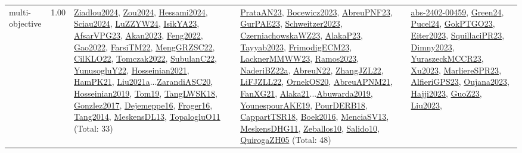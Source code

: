 {\begin{longtable}{p{3cm}r>{\raggedright\arraybackslash}p{6cm}>{\raggedright\arraybackslash}p{6cm}>{\raggedright\arraybackslash}p{8cm}}
\index{multi-objective}\index{Concepts!multi-objective}multi-objective &  1.00 & \hyperref[detail:Ziadlou2024]{Ziadlou2024}, \hyperref[detail:Zou2024]{Zou2024}, \hyperref[detail:Hessami2024]{Hessami2024}, \hyperref[detail:Sciau2024]{Sciau2024}, \hyperref[detail:LuZZYW24]{LuZZYW24}, \hyperref[detail:IsikYA23]{IsikYA23}, \hyperref[detail:AfsarVPG23]{AfsarVPG23}, \hyperref[detail:Akan2023]{Akan2023}, \hyperref[detail:Feng2022]{Feng2022}, \hyperref[detail:Gao2022]{Gao2022}, \hyperref[detail:FarsiTM22]{FarsiTM22}, \hyperref[detail:MengGRZSC22]{MengGRZSC22}, \hyperref[detail:CilKLO22]{CilKLO22}, \hyperref[detail:Tomczak2022]{Tomczak2022}, \hyperref[detail:SubulanC22]{SubulanC22}, \hyperref[detail:YunusogluY22]{YunusogluY22}, \hyperref[detail:Hosseinian2021]{Hosseinian2021}, \hyperref[detail:HamPK21]{HamPK21}, \hyperref[detail:Liu2021a]{Liu2021a}...\hyperref[detail:ZarandiASC20]{ZarandiASC20}, \hyperref[detail:Hosseinian2019]{Hosseinian2019}, \hyperref[detail:Tom19]{Tom19}, \hyperref[detail:TangLWSK18]{TangLWSK18}, \hyperref[detail:Gonzlez2017]{Gonzlez2017}, \hyperref[detail:Dejemeppe16]{Dejemeppe16}, \hyperref[detail:Froger16]{Froger16}, \hyperref[detail:Tang2014]{Tang2014}, \hyperref[detail:MeskensDL13]{MeskensDL13}, \hyperref[detail:TopalogluO11]{TopalogluO11} (Total: 33) & \hyperref[detail:PrataAN23]{PrataAN23}, \hyperref[detail:Bocewicz2023]{Bocewicz2023}, \hyperref[detail:AbreuPNF23]{AbreuPNF23}, \hyperref[detail:GurPAE23]{GurPAE23}, \hyperref[detail:Schweitzer2023]{Schweitzer2023}, \hyperref[detail:CzerniachowskaWZ23]{CzerniachowskaWZ23}, \hyperref[detail:AlakaP23]{AlakaP23}, \hyperref[detail:Tayyab2023]{Tayyab2023}, \hyperref[detail:FrimodigECM23]{FrimodigECM23}, \hyperref[detail:LacknerMMWW23]{LacknerMMWW23}, \hyperref[detail:Ramos2023]{Ramos2023}, \hyperref[detail:NaderiBZ22a]{NaderiBZ22a}, \hyperref[detail:AbreuN22]{AbreuN22}, \hyperref[detail:ZhangJZL22]{ZhangJZL22}, \hyperref[detail:LiFJZLL22]{LiFJZLL22}, \hyperref[detail:OrnekOS20]{OrnekOS20}, \hyperref[detail:AbreuAPNM21]{AbreuAPNM21}, \hyperref[detail:FanXG21]{FanXG21}, \hyperref[detail:Alaka21]{Alaka21}...\hyperref[detail:Abuwarda2019]{Abuwarda2019}, \hyperref[detail:YounespourAKE19]{YounespourAKE19}, \hyperref[detail:PourDERB18]{PourDERB18}, \hyperref[detail:CappartTSR18]{CappartTSR18}, \hyperref[detail:Boek2016]{Boek2016}, \hyperref[detail:MenciaSV13]{MenciaSV13}, \hyperref[detail:MeskensDHG11]{MeskensDHG11}, \hyperref[detail:Zeballos10]{Zeballos10}, \hyperref[detail:Salido10]{Salido10}, \hyperref[detail:QuirogaZH05]{QuirogaZH05} (Total: 48) & \hyperref[detail:abs-2402-00459]{abs-2402-00459}, \hyperref[detail:Green24]{Green24}, \hyperref[detail:Pucel24]{Pucel24}, \hyperref[detail:GokPTGO23]{GokPTGO23}, \hyperref[detail:Eiter2023]{Eiter2023}, \hyperref[detail:SquillaciPR23]{SquillaciPR23}, \hyperref[detail:Dimny2023]{Dimny2023}, \hyperref[detail:YuraszeckMCCR23]{YuraszeckMCCR23}, \hyperref[detail:Xu2023]{Xu2023}, \hyperref[detail:MarliereSPR23]{MarliereSPR23}, \hyperref[detail:AlfieriGPS23]{AlfieriGPS23}, \hyperref[detail:Oujana2023]{Oujana2023}, \hyperref[detail:Hajji2023]{Hajji2023}, \hyperref[detail:GuoZ23]{GuoZ23}, \hyperref[detail:Liu2023]{Liu2023}, 
\end{longtable}}
